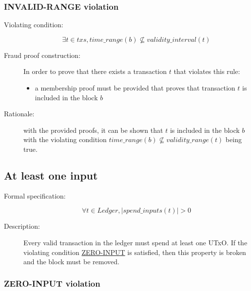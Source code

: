 \documentclass[../midgard.tex]{subfiles}
\begin{document}
\subsubsection{INVALID-RANGE violation}
\label{violation:INVALID-RANGE}

\begin{description}

\item[Violating condition:]
\begin{equation*}
    \exists t \in txs, time\_range(b) \nsubseteq validity\_interval(t)
\end{equation*}

\item[Fraud proof construction:] In order to prove that there exists a transaction $t$ that violates this rule:
\begin{itemize}
    \item a membership proof must be provided that proves that transaction $t$ is included in the block $b$
\end{itemize}

\item[Rationale:] with the provided proofs, it can be shown that $t$ is included in the block $b$ with the violating condition $time\_range(b) \nsubseteq validity\_range(t)$ being true.

\end{description}

\subsection{At least one input}
\label{rule:at-least-one-input}

\begin{description}

\item[Formal specification:]
\begin{equation*}
    \forall t \in Ledger, |spend\_inputs(t)| > 0
\end{equation*}

\item[Description:] Every valid transaction in the ledger must spend at least one UTxO.
  If the violating condition \hyperref[violation:ZERO-INPUT]{ZERO-INPUT} is satisfied, then this property is broken and the block must be removed.

\end{description}

\subsubsection{ZERO-INPUT violation}
\label{violation:ZERO-INPUT}
\end{document}
